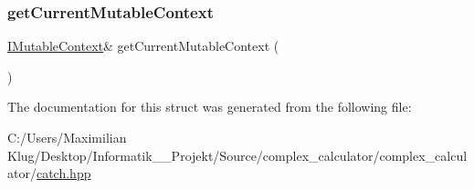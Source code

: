 \mbox{\label{struct_catch_1_1_i_mutable_context_aea4b25692aaf4397cdf630716976f6b8}} 
\subsubsection{\texorpdfstring{get\+Current\+Mutable\+Context}{getCurrentMutableContext}}
{\footnotesize\ttfamily \mbox{\hyperlink{struct_catch_1_1_i_mutable_context}{I\+Mutable\+Context}}\& get\+Current\+Mutable\+Context (\begin{DoxyParamCaption}{ }\end{DoxyParamCaption})\hspace{0.3cm}{\ttfamily [friend]}}



The documentation for this struct was generated from the following file\+:\begin{DoxyCompactItemize}
\item 
C\+:/\+Users/\+Maximilian Klug/\+Desktop/\+Informatik\+\_\+\_\+\+Projekt/\+Source/complex\+\_\+calculator/complex\+\_\+calculator/\mbox{\hyperlink{catch_8hpp}{catch.\+hpp}}\end{DoxyCompactItemize}
